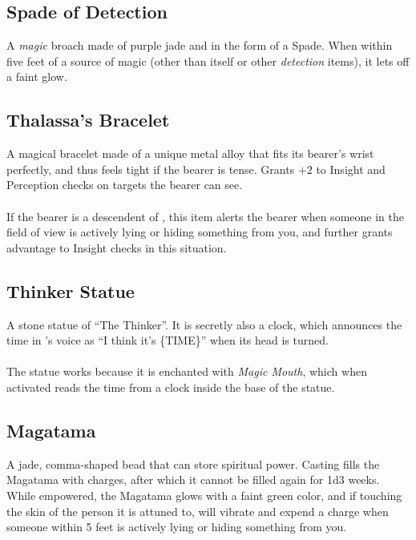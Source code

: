 \subsection{Spade of Detection}
\label{items:detectspade}
A \textit{magic} broach made of purple jade and in the form of a Spade. When within five feet of a source of magic (other than itself or other \textit{detection} items), it lets off a faint glow.

\subsection{Thalassa's Bracelet}
\label{items:bracelet}
A magical bracelet made of a unique metal alloy that fits its bearer's wrist perfectly, and thus feels tight if the bearer is tense. Grants $+2$ to Insight and Perception checks on targets the bearer can see.\\
\\
If the bearer is a descendent of , this item alerts the bearer when someone in the field of view is actively lying or hiding something from you, and further grants advantage to Insight checks in this situation.

\subsection{Thinker Statue}
\label{items:thinker}
A stone statue of ``The Thinker''. It is secretly also a clock, which announces the time in 's voice as ``I think it's \{TIME\}'' when its head is turned. \\
\\
The statue works because it is enchanted with \textit{Magic Mouth}, which when activated reads the time from a clock inside the base of the statue.

\subsection{Magatama}
\label{items:magatama}
A jade, comma-shaped bead that can store spiritual power. Casting  fills the Magatama with charges, after which it cannot be filled again for 1d3 weeks. While empowered, the Magatama glows with a faint green color, and if touching the skin of the person it is attuned to, will vibrate and expend a charge when someone within 5 feet is actively lying or hiding something from you.